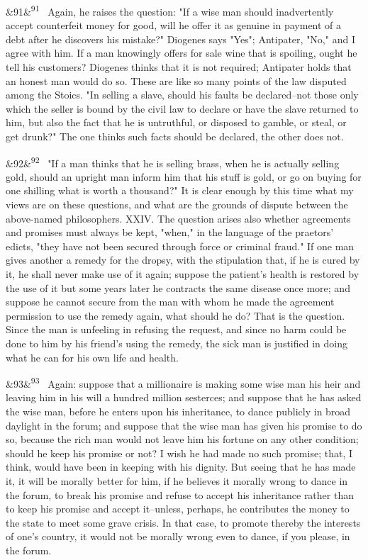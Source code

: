 \documentclass[12pt]{article}
\newcommand{\para}[1][]{\par\noindent\ifx&#1&\else\textsuperscript{\footnotesize #1}~\fi}
\begin{document}
\para[91] Again, he raises the question: "If a wise man should inadvertently accept counterfeit money for good, will he offer it as genuine in payment of a debt after he discovers his mistake?" Diogenes says "Yes"; Antipater, "No," and I agree with him. If a man knowingly offers for sale wine that is spoiling, ought he tell his customers? Diogenes thinks that it is not required; Antipater holds that an honest man would do so. These are like so many points of the law disputed among the Stoics. "In selling a slave, should his faults be declared--not those only which the seller is bound by the civil law to declare or have the slave returned to him, but also the fact that he is untruthful, or disposed to gamble, or steal, or get drunk?" The one thinks such facts should be declared, the other does not.

\para[92] "If a man thinks that he is selling brass, when he is actually selling gold, should an upright man inform him that his stuff is gold, or go on buying for one shilling what is worth a thousand?" It is clear enough by this time what my views are on these questions, and what are the grounds of dispute between the above-named philosophers. XXIV. The question arises also whether agreements and promises must always be kept, "when," in the language of the praetors' edicts, "they have not been secured through force or criminal fraud." If one man gives another a remedy for the dropsy, with the stipulation that, if he is cured by it, he shall never make use of it again; suppose the patient's health is restored by the use of it but some years later he contracts the same disease once more; and suppose he cannot secure from the man with whom he made the agreement permission to use the remedy again, what should he do? That is the question. Since the man is unfeeling in refusing the request, and since no harm could be done to him by his friend's using the remedy, the sick man is justified in doing what he can for his own life and health.

\para[93] Again: suppose that a millionaire is making some wise man his heir and leaving him in his will a hundred million sesterces; and suppose that he has asked the wise man, before he enters upon his inheritance, to dance publicly in broad daylight in the forum; and suppose that the wise man has given his promise to do so, because the rich man would not leave him his fortune on any other condition; should he keep his promise or not? I wish he had made no such promise; that, I think, would have been in keeping with his dignity. But seeing that he has made it, it will be morally better for him, if he believes it morally wrong to dance in the forum, to break his promise and refuse to accept his inheritance rather than to keep his promise and accept it--unless, perhaps, he contributes the money to the state to meet some grave crisis. In that case, to promote thereby the interests of one's country, it would not be morally wrong even to dance, if you please, in the forum.
\end{document}
